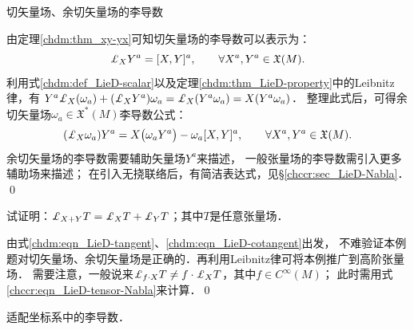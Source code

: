 \begin{example}
    切矢量场、余切矢量场的李导数
\end{example}
由定理\ref{chdm:thm_xy-yx}可知切矢量场的李导数可以表示为：
\begin{equation}\label{chdm:eqn_LieD-tangent}
    \Lie_{X} Y^{a} = [X, Y]^a , \qquad \forall X^a, Y^a \in \mathfrak{X}(M).
\end{equation}
利用式\eqref{chdm:def_LieD-scalar}以及定理\ref{chdm:thm_LieD-property}中的Leibnitz律，有
$  Y^a \Lie_{X}( \omega_a ) +(\Lie_{X}Y^a) \omega_a = \Lie_{X}(Y^a \omega_a )
     = X(Y^a \omega_a) $．
整理此式后，可得余切矢量场$\omega_a\in \mathfrak{X}^*(M)$李导数公式：
\begin{equation}\label{chdm:eqn_LieD-cotangent}
    (\Lie_{X} \omega_a ) Y^a = X\bigl(\omega_a Y^a\bigr) 
    - \omega_a [X, Y]^a, \qquad \forall X^a, Y^a \in \mathfrak{X}(M).
\end{equation}
余切矢量场的李导数需要辅助矢量场$Y^a$来描述，
一般张量场的李导数需引入更多辅助场来描述；
在引入无挠联络后，有简洁表达式，见\S \ref{chccr:sec_LieD-Nabla}．
\qed

\begin{example}
    试证明：$\Lie_{X+Y} T = \Lie_{X} T  +\Lie_{Y} T $；其中$T$是任意张量场．
\end{example}
由式\eqref{chdm:eqn_LieD-tangent}、\eqref{chdm:eqn_LieD-cotangent}出发，
不难验证本例题对切矢量场、余切矢量场是正确的．再利用Leibnitz律可将本例推广到高阶张量场．
需要注意，一般说来$\Lie_{f\cdot X} T \neq f\cdot \Lie_{X} T$，其中$f\in C^\infty(M)$；
此时需用式\eqref{chccr:eqn_LieD-tensor-Nabla}来计算．\qed


\begin{example}
    适配坐标系中的李导数．
\end{example}

